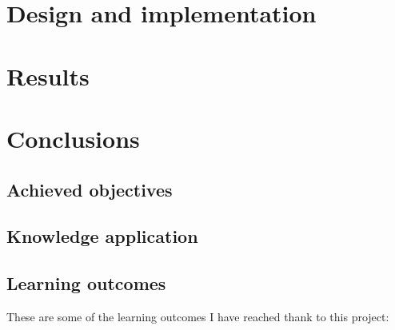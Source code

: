 \documentclass[a4paper, 12pt]{book}
\begin{document}
\cleardoublepage
\chapter{Design and implementation}
\label{sec:design-implementation}


\cleardoublepage
\chapter{Results}
\label{sec:results}


\cleardoublepage
\chapter{Conclusions}
\label{sec:conclusions}


\section{Achieved objectives}
\label{sec:achieved-objectives}

\section{Knowledge application}
\label{sec:knowledge-application}


\section{Learning outcomes}
\label{sec:learning-outcomes}
These are some of the learning outcomes I have reached thank to this project:


\end{document}
